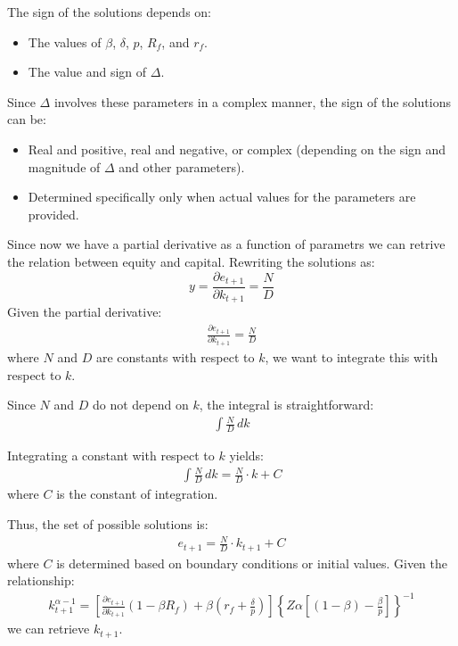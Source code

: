 \documentclass[12pt]{article}
\begin{document}
The sign of the solutions depends on:
\begin{itemize}
    \item The values of \( \beta \), \( \delta \), \( p \), \( R_f \), and \( r_f \).
    \item The value and sign of \( \Delta \).
\end{itemize}
Since \( \Delta \) involves these parameters in a complex manner, the sign of the solutions can be:
\begin{itemize}
    \item Real and positive, real and negative, or complex (depending on the sign and magnitude of \( \Delta \) and other parameters).
    \item Determined specifically only when actual values for the parameters are provided.
\end{itemize}
Since now we have a partial derivative as a function of parametrs we can retrive the relation between equity and
capital.
Rewriting the solutions as:
\[y =\frac{\partial e_{t+1}}{\partial k_{t+1}}= \frac{N}{D}\]
Given the partial derivative:
\begin{align*}
    \frac{\partial e_{t+1}}{\partial k_{t+1}} = \frac{N}{D}
\end{align*}
where \(N\) and \(D\) are constants with respect to \(k\), we want to integrate this with respect to \(k\).

Since \(N\) and \(D\) do not depend on \(k\), the integral is straightforward:
\begin{align*}
    \int \frac{N}{D} \, dk
\end{align*}

Integrating a constant with respect to \(k\) yields:
\begin{align*}
    \int \frac{N}{D} \, dk = \frac{N}{D} \cdot k + C
\end{align*}
where \(C\) is the constant of integration.

Thus, the set of possible solutions is:
\begin{align*}
    e_{t+1} = \frac{N}{D} \cdot k_{t+1} + C
\end{align*}
where \(C\) is determined based on boundary conditions or initial values.
Given the relationship:
\begin{align*}
    k^{\alpha-1}_{t+1} = \left[\frac{\partial e_{t+1}}{\partial k_{t+1}}\left(1-\beta R_f\right) + \beta \left(r_f+\frac{\delta}{p}\right)\right]\left\{Z\alpha\left[\left(1-\beta\right)-\frac{\beta}{p}\right]\right\}^{-1}
\end{align*}
we can retrieve \(k_{t+1}\).
\end{document}
